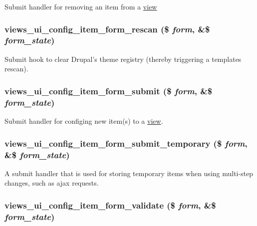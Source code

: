 \label{admin_8inc_a7f602db6d4cc41b412a8ace2d6320ea8}
Submit handler for removing an item from a \hyperlink{classview}{view} \hypertarget{admin_8inc_a2f6df8066d61dc4f84b6bdbfffc70c1c}{
\subsubsection[{views\_\-ui\_\-config\_\-item\_\-form\_\-rescan}]{\setlength{\rightskip}{0pt plus 5cm}views\_\-ui\_\-config\_\-item\_\-form\_\-rescan (\$ {\em form}, \/  \&\$ {\em form\_\-state})}}
\label{admin_8inc_a2f6df8066d61dc4f84b6bdbfffc70c1c}
Submit hook to clear Drupal's theme registry (thereby triggering a templates rescan). \hypertarget{admin_8inc_af158b94f2b2f0886fde847d3f378c8ed}{
\subsubsection[{views\_\-ui\_\-config\_\-item\_\-form\_\-submit}]{\setlength{\rightskip}{0pt plus 5cm}views\_\-ui\_\-config\_\-item\_\-form\_\-submit (\$ {\em form}, \/  \&\$ {\em form\_\-state})}}
\label{admin_8inc_af158b94f2b2f0886fde847d3f378c8ed}
Submit handler for configing new item(s) to a \hyperlink{classview}{view}. \hypertarget{admin_8inc_a1925902f1636137e1b003a2b26667133}{
\subsubsection[{views\_\-ui\_\-config\_\-item\_\-form\_\-submit\_\-temporary}]{\setlength{\rightskip}{0pt plus 5cm}views\_\-ui\_\-config\_\-item\_\-form\_\-submit\_\-temporary (\$ {\em form}, \/  \&\$ {\em form\_\-state})}}
\label{admin_8inc_a1925902f1636137e1b003a2b26667133}
A submit handler that is used for storing temporary items when using multi-\/step changes, such as ajax requests. \hypertarget{admin_8inc_a023993084cf3409a55a8831df1d0935b}{
\subsubsection[{views\_\-ui\_\-config\_\-item\_\-form\_\-validate}]{\setlength{\rightskip}{0pt plus 5cm}views\_\-ui\_\-config\_\-item\_\-form\_\-validate (\$ {\em form}, \/  \&\$ {\em form\_\-state})}}
